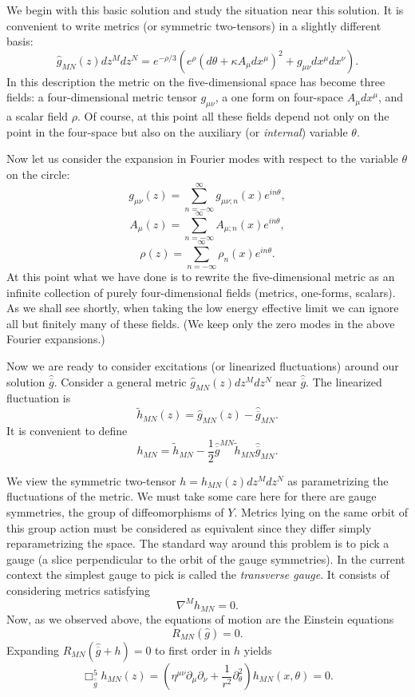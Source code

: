 We begin with this basic solution and study the situation near this
solution. 
It is convenient to write metrics (or symmetric two-tensors) in a
slightly different basis: 
$$\widehat{g}_{MN}(z)dz^M
dz^N=e^{-\rho/3}\left(e^\rho\left(d\theta+\kappa A_\mu 
dx^\mu\right)^2+g_{\mu\nu} dx^\mu dx^\nu\right).$$
In this description the metric on the five-dimensional space has
become three fields: a four-dimensional metric tensor $g_{\mu\nu}$, a
one form on four-space $A_\mu dx^\mu$, and a scalar field $\rho$.  Of 
course, at this point all these fields depend not only on the point in
the four-space but also on the auxiliary (or {\sl internal}) variable
$\theta$. 


Now let us consider the expansion in Fourier modes with respect to the
variable $\theta$ on the circle:
$$g_{\mu\nu}(z)=\sum_{n=-\infty}^\infty g_{\mu\nu;n}(x)e^{in\theta},$$ 
$$A_\mu(z)=\sum_{n=-\infty}^\infty A_{\mu;n}(x)e^{in\theta},$$
$$\rho(z)=\sum_{n=-\infty}^\infty\rho_n(x)e^{in\theta}.$$
At this point what we have done is to rewrite the five-dimensional
metric as an infinite collection of purely four-dimensional fields
(metrics, one-forms, scalars). As we shall see shortly, when taking
the low energy effective limit we can ignore all but finitely many of
these fields. (We keep only the zero modes in the above  Fourier
expansions.) 

Now we are ready to consider excitations (or linearized
fluctuations) 
around our solution $\widehat{\overline{g}}$.  Consider a general metric
$\widehat{g}_{MN}(z)dz^Mdz^N$  near $\widehat{\overline{g}}$. The
linearized fluctuation is 
$$\tilde h_{MN}(z)=\widehat{g}_{MN}(z)-\widehat{\overline{g}}_{MN}.$$ 
It is convenient to define
$$h_{MN}=\tilde h_{MN}-\frac{1}{2} \widehat{\overline{g}}^{MN}\tilde
h_{MN} \widehat{\overline{g}}_{MN}.$$

We view the symmetric two-tensor $h=h_{MN}(z)dz^M dz^N$ as
parametrizing the fluctuations of the metric. 
We must take some care here for there are gauge symmetries,
the group of diffeomorphisms of $Y$. Metrics lying on the same orbit
of this group action must
be considered as equivalent since they differ simply
reparametrizing the space.
The standard way around this problem is to pick a gauge (a slice
perpendicular to the orbit of the gauge symmetries). In the current
context the simplest gauge to pick is called the {\sl transverse
gauge}.  It consists of considering metrics 
satisfying
$$
\nabla^Mh_{MN}   =  0.
$$
Now, as we observed above, the equations of motion are the
Einstein equations
$$R_{MN}(\widehat{g})=0.$$
Expanding $R_{MN}(\widehat{\overline{g}}+h)=0$ to first order in $h$ yields
$$\Box^5_{\widehat{\overline{g}}}h_{MN}(z)=
\left(\eta^{\mu\nu}\partial_\mu\partial_\nu
+\frac{1}{r^2}\partial_\theta^2\right)h_{MN}(x,\theta)=0.$$  

